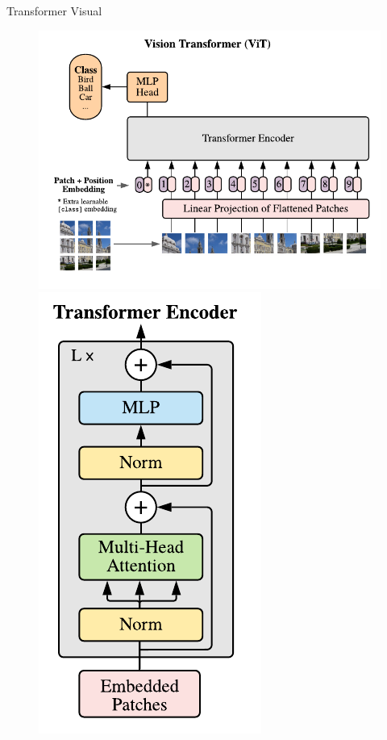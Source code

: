 \documentclass[8pt]{beamer}
\begin{document}
\begin{frame}{Transformer Visual}

    \begin{figure}[!ht]
        \centering
        \includegraphics[width=0.7\columnwidth]{
            Imagens/vit.png
        }
        \includegraphics[width=0.2\columnwidth]{
            Imagens/encoder.png
        }
        \caption{\cite{dosovitskiy2020image}}
        \label{fig:vit}
    \end{figure}
\end{frame}
\end{document}
